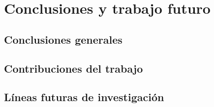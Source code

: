 
\chapter{Conclusiones y trabajo futuro}

\section{Conclusiones generales}

\section{Contribuciones del trabajo}

\section{Líneas futuras de investigación}